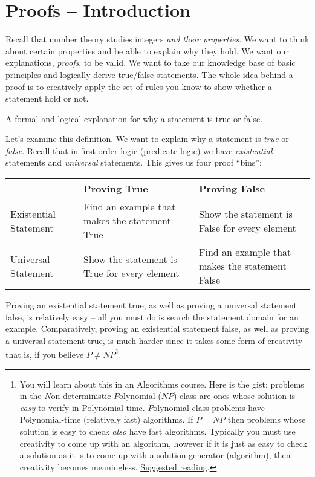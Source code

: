 \documentclass[main.tex]{subfiles}
\begin{document}

\section{Proofs -- Introduction}

Recall that number theory studies integers \textit{and their properties}. We want to think about certain properties and be able to explain why they hold. We want our explanations, \textit{proofs}, to be valid. We want to take our knowledge base of basic principles and logically derive true/false statements. The whole idea behind a proof is to creatively apply the set of rules you know to show whether a statement hold or not.

\begin{defn}
	A formal and logical explanation for why a statement is true or false.
\end{defn}

Let's examine this definition. We want to explain why a statement is \textit{true} or \textit{false}. Recall that in first-order logic (predicate logic) we have \textit{existential} statements and \textit{universal} statements. This gives us four proof ``bins'':

\begin{tabularx}{\textwidth}{lXX}
	\toprule
	& Proving True & Proving False \\
	\midrule
	Existential Statement & Find an example that makes the statement True & Show the statement is False for every element \\
	\midrule
	Universal Statement & Show the statement is True for every element & Find an example that makes the statement False \\
	\bottomrule
\end{tabularx}

Proving an existential statement true, as well as proving a universal statement false, is relatively easy -- all you must do is search the statement domain for an example. Comparatively, proving an existential statement false, as well as proving a universal statement true, is much harder since it takes some form of creativity -- that is, if you believe \(P \neq NP\)\footnote{You will learn about this in an Algorithms course. Here is the gist: problems in the \(N\)on-deterministic \(P\)olynomial (\(NP\)) class are ones whose solution is \textit{easy} to verify in Polynomial time. \(P\)olynomial class problems have Polynomial-time (relatively fast) algorithms. If \(P = NP\) then problems whose solution is easy to check \textit{also} have fast algorithms. Typically you must use creativity to come up with an algorithm, however if it is just as easy to check a solution as it is to come up with a solution generator (algorithm), then creativity becomes meaningless. \href{https://youtu.be/YX40hbAHx3s}{Suggested reading}.}.
\end{document}
